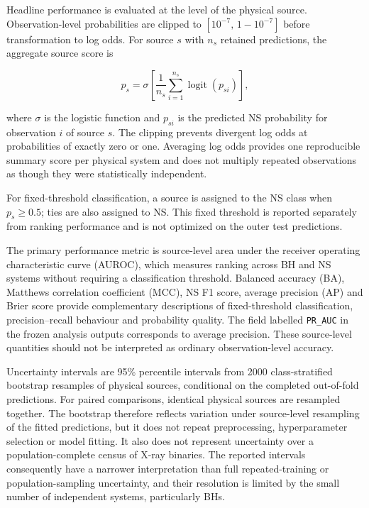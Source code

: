 \documentclass[final,5p,authoryear,nopreprintline]{elsarticle}
\begin{document}
Headline performance is evaluated at the level of the physical source. Observation-level probabilities are clipped to $[10^{-7},\,1-10^{-7}]$ before transformation to log odds. For source $s$ with $n_s$ retained predictions, the aggregate source score is

\begin{equation}
\label{eq:source-score}
p_s =
\sigma\left[
\frac{1}{n_s}
\sum_{i=1}^{n_s}
\operatorname{logit}(p_{si})
\right],
\end{equation}

where $\sigma$ is the logistic function and $p_{si}$ is the predicted NS probability for observation $i$ of source $s$. The clipping prevents divergent log odds at probabilities of exactly zero or one. Averaging log odds provides one reproducible summary score per physical system and does not multiply repeated observations as though they were statistically independent.

For fixed-threshold classification, a source is assigned to the NS class when $p_s \geq 0.5$; ties are also assigned to NS. This fixed threshold is reported separately from ranking performance and is not optimized on the outer test predictions.

The primary performance metric is source-level area under the receiver operating characteristic curve (AUROC), which measures ranking across BH and NS systems without requiring a classification threshold. Balanced accuracy (BA), Matthews correlation coefficient (MCC), NS F1 score, average precision (AP) and Brier score provide complementary descriptions of fixed-threshold classification, precision--recall behaviour and probability quality. The field labelled \texttt{PR\_AUC} in the frozen analysis outputs corresponds to average precision. These source-level quantities should not be interpreted as ordinary observation-level accuracy.

Uncertainty intervals are 95\% percentile intervals from 2000 class-stratified bootstrap resamples of physical sources, conditional on the completed out-of-fold predictions. For paired comparisons, identical physical sources are resampled together. The bootstrap therefore reflects variation under source-level resampling of the fitted predictions, but it does not repeat preprocessing, hyperparameter selection or model fitting. It also does not represent uncertainty over a population-complete census of X-ray binaries. The reported intervals consequently have a narrower interpretation than full repeated-training or population-sampling uncertainty, and their resolution is limited by the small number of independent systems, particularly BHs.
\end{document}
